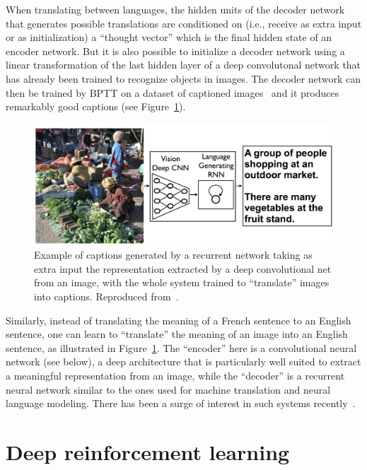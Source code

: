 \documentclass[]{article}
\begin{document}
When translating between languages, the hidden units of the decoder network
that generates possible translations are conditioned on (i.e., receive as extra
input or as initialization) a ``thought
vector'' which is the final hidden state of an encoder network.  But it is
also possible to initialize a decoder network using a linear transformation
of the last hidden layer of a deep convolutonal network that has already
been trained to recognize objects in images. The decoder network can then
be trained by BPTT on a dataset of captioned
images~\citep{NIC,StanfordNIC,more?} and it produces remarkably good
captions (see Figure~\ref{fig:caption-generation}).

\begin{figure}[ht]
\centerline{\includegraphics[width=\linewidth]{caption-generation-Vinyals-et-al.png}}
\caption{Example of captions generated by a recurrent network taking
as extra input the representation extracted by a deep convolutional
net from an image, with the whole system trained to ``translate''
images into captions. Reproduced from~\citet{Vinyals-et-al-arxiv2014}.
}
\label{fig:caption-generation}
\end{figure}

Similarly, instead of translating the meaning of a French sentence to an English sentence,
one can learn to ``translate'' the meaning of an image into an English sentence,
as illustrated in Figure~\ref{fig:caption-generation}. The ``encoder'' here is
a convolutional neural network (see below), a deep architecture that is particularly
well suited to extract a meaningful representation from an image, while the ``decoder''
is a recurrent neural network similar to the ones used for machine translation
and neural language modeling. There has been a surge of interest in such
systems recently~\citep{Vinyals-et-al-arxiv2014,OTHER-CAPTION-GENERATION-PAPERS}.


\section{Deep reinforcement learning}
\end{document}
